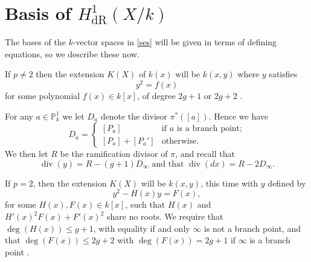 \documentclass[draft, 11pt]{article} %
\theoremstyle{plain}
\theoremstyle{remark}
\newcommand{\cO}{{\cal O}}
\newcommand{\derhamhone}{H_{\text {dR}}^1(X/k)}
\DeclareMathOperator{\di}{div}
\begin{document}
\begin{comment}
In order to do this we will need to use Serre duality, which we briefly remind the reader of presently.
Serre duality states that $H^0(X,\Omega_X)$ and $H^1(X,\cO_X)$ are dual to each other, and that there is a canonical map ${\text Res}:H^0(X,\omega_X) \times H^1(X,\cO_X) \rightarrow k$.
Details of the definition of ${\text Res}$ can be found in appendix B of \todo{in progress}
\todo[inline]{add details - in particular, relate to the basis we have for de rham}
\end{comment}
\section{Basis of $\derhamhone$}

The bases of the $k$-vector spaces in \eqref{ses} will be given in terms of defining equations, so we describe these now.

If $p \neq 2$ then the extension $K(X)$ of $k(x)$ will be $k(x,y)$ where $y$ satisfies
\begin{equation}\label{definingequationpnot2}
y^2 = f(x)
\end{equation}
for some polynomial $f(x) \in k[x]$, of degree $2g+1$ or $2g+2$ \cite[Prop 7.4.24]{liu}.

For any $a\in \mathbb P_k^1$ we let $D_a$ denote the divisor $\pi^*([a])$.
Hence we have
\begin{equation}\label{divisorofpoints}
D_a= 
\begin{cases}
 [P_a] & \text{if $a$ is a branch point;} \\
 [P_a] + [P_a'] & \text{otherwise.}
\end{cases}
\end{equation}
We then let $R$ be the ramification divisor of $\pi$, and recall that 
\begin{equation}\label{pnot2divisors}
\di(y)  = R - (g+1)D_\infty \text{ and that } \di( dx) = R - 2D_\infty.
\end{equation}


If $p=2$, then the extension $K(X)$ will be $k(x,y)$, this time with $y$ defined by
\begin{equation}\label{definep=2}
y^2 - H(x)y = F(x),
\end{equation}
for some $H(x),F(x) \in k[x]$, such that $H(x)$ and $H'(x)^2F(x) + F'(x)^2$ share no roots.
We require that $\deg(H(x)) \leq g+1$, with equality if and only $\infty$ is not a branch point, and that $\deg(F(x)) \leq 2g+2$ with $\deg(F(x)) = 2g+1$ if $\infty$ is a branch point  \cite[Prop 7.4.24]{liu}.
\end{document}
